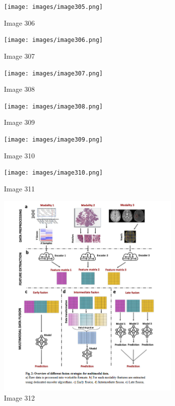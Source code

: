 \documentclass{article}%
\begin{document}
%


\begin{figure}[h!]%
\centering%
\texttt{[image: images/image305.png]}%
\caption{Image 306}%
\end{figure}

%


\begin{figure}[h!]%
\centering%
\texttt{[image: images/image306.png]}%
\caption{Image 307}%
\end{figure}

%


\begin{figure}[h!]%
\centering%
\texttt{[image: images/image307.png]}%
\caption{Image 308}%
\end{figure}

%


\begin{figure}[h!]%
\centering%
\texttt{[image: images/image308.png]}%
\caption{Image 309}%
\end{figure}

%


\begin{figure}[h!]%
\centering%
\texttt{[image: images/image309.png]}%
\caption{Image 310}%
\end{figure}

%


\begin{figure}[h!]%
\centering%
\texttt{[image: images/image310.png]}%
\caption{Image 311}%
\end{figure}

%


\begin{figure}[h!]%
\centering%
\includegraphics[width=0.8\textwidth]{images/image311.png}%
\caption{Image 312}%
\end{figure}
\end{document}
